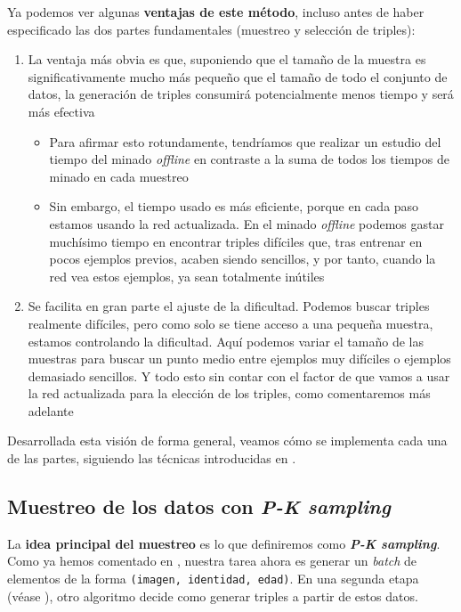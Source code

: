 Ya podemos ver algunas \textbf{ventajas de este método}, incluso antes de haber especificado las dos partes fundamentales (muestreo y selección de triples):

\begin{enumerate}
    \item La ventaja más obvia es que, suponiendo que el tamaño de la muestra es significativamente mucho más pequeño que el tamaño de todo el conjunto de datos, la generación de triples consumirá potencialmente menos tiempo y será más efectiva
        \begin{itemize}
            \item Para afirmar esto rotundamente, tendríamos que realizar un estudio del tiempo del minado \textit{offline} en contraste a la suma de todos los tiempos de minado en cada muestreo
            \item Sin embargo, el tiempo usado es más eficiente, porque en cada paso estamos usando la red actualizada. En el minado \textit{offline} podemos gastar muchísimo tiempo en encontrar triples difíciles que, tras entrenar en pocos ejemplos previos, acaben siendo sencillos, y por tanto, cuando la red vea estos ejemplos, ya sean totalmente inútiles
        \end{itemize}
    \item Se facilita en gran parte el ajuste de la dificultad. Podemos buscar triples realmente difíciles, pero como solo se tiene acceso a una pequeña muestra, estamos controlando la dificultad. Aquí podemos variar el tamaño de las muestras para buscar un punto medio entre ejemplos muy difíciles o ejemplos demasiado sencillos. Y todo esto sin contar con el factor de que vamos a usar la red actualizada para la elección de los triples, como comentaremos más adelante
\end{enumerate}

Desarrollada esta visión de forma general, veamos cómo se implementa cada una de las partes, siguiendo las técnicas introducidas en \cite{informatica:principal}.

\subsection{Muestreo de los datos con \textit{P-K sampling}}

La \textbf{idea principal del muestreo} es lo que definiremos como \textbf{\textit{P-K sampling}}. Como ya hemos comentado en , nuestra tarea ahora es generar un \textit{batch} de elementos de la forma \lstinline{(imagen, identidad, edad)}. En una segunda etapa (véase ), otro algoritmo decide como generar triples a partir de estos datos.

